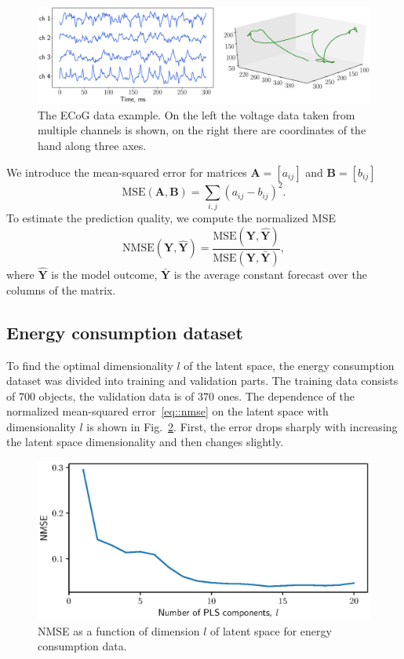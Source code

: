 \documentclass[runningheads]{llncs}
\newcommand{\bY}{\mathbf{Y}}
\begin{document}
\begin{figure}
	\includegraphics[width=\linewidth]{figs/ecog_data.eps}
	\caption{The ECoG data example. On the left the voltage data taken from multiple channels is shown, on the right there are coordinates of the hand along three axes.}
	\label{fig::ecog_data}
\end{figure}

We introduce the mean-squared error for matrices $\mathbf{A} = [a_{ij}]$ and $\mathbf{B} = [b_{ij}]$ 
\[
\text{MSE} (\mathbf{A}, \mathbf{B}) = \sum_{i,j} (a_{ij} - b_{ij})^2.
\]
To estimate the prediction quality, we compute the normalized MSE 
\begin{equation}
\text{NMSE}(\bY,  \mathbf{\hat{Y}}) = \frac{\text{MSE} (\bY, \mathbf{\hat{Y}})}{\text{MSE} (\bY, \mathbf{\bar{Y}})},
\label{eq::nmse}
\end{equation}
where $\mathbf{\hat{Y}}$ is the model outcome, $\mathbf{\bar{Y}}$ is the average constant forecast over the columns of the matrix.

\subsection{Energy consumption dataset}

To find the optimal dimensionality $l$ of the latent space, the energy consumption dataset was divided into training and validation parts. 
The training data consists of $700$ objects, the validation data is of $370$ ones. The dependence of the normalized mean-squared error~\eqref{eq::nmse} on the latent space with dimensionality $l$ is shown in Fig.~\ref{fig::energy_n_comp}. 
First, the error drops sharply with increasing the latent space dimensionality and then changes slightly.

\begin{figure}[!h]
	\centering
	\includegraphics[width=0.8\linewidth]{figs/energy_n_comp}
	\caption{NMSE as a function of dimension $l$ of latent space for energy consumption data.}
	\label{fig::energy_n_comp}
\end{figure}
\end{document}
